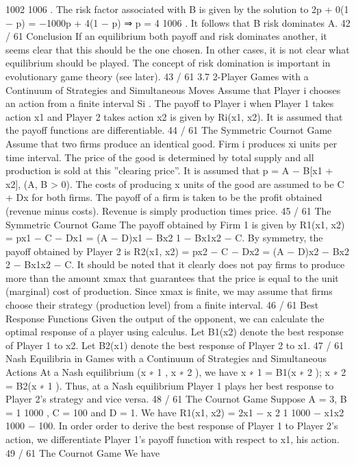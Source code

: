 1002
1006
.
The risk factor associated with B is given by the solution to
2p + 0(1 − p) = −1000p + 4(1 − p) ⇒ p =
4
1006
.
It follows that B risk dominates A.
42 / 61
Conclusion
If an equilibrium both payoff and risk dominates another, it seems
clear that this should be the one chosen.
In other cases, it is not clear what equilibrium should be played.
The concept of risk domination is important in evolutionary game
theory (see later).
43 / 61
3.7 2-Player Games with a Continuum of Strategies and
Simultaneous Moves
Assume that Player i chooses an action from a finite interval Si
.
The payoff to Player i when Player 1 takes action x1 and Player 2
takes action x2 is given by Ri(x1, x2).
It is assumed that the payoff functions are differentiable.
44 / 61
The Symmetric Cournot Game
Assume that two firms produce an identical good. Firm i produces
xi units per time interval.
The price of the good is determined by total supply and all
production is sold at this ”clearing price”. It is assumed that
p = A − B[x1 + x2], (A, B > 0).
The costs of producing x units of the good are assumed to be
C + Dx for both firms.
The payoff of a firm is taken to be the profit obtained (revenue
minus costs). Revenue is simply production times price.
45 / 61
The Symmetric Cournot Game
The payoff obtained by Firm 1 is given by
R1(x1, x2) = px1 − C − Dx1 = (A − D)x1 − Bx2
1 − Bx1x2 − C.
By symmetry, the payoff obtained by Player 2 is
R2(x1, x2) = px2 − C − Dx2 = (A − D)x2 − Bx2
2 − Bx1x2 − C.
It should be noted that it clearly does not pay firms to produce
more than the amount xmax that guarantees that the price is equal
to the unit (marginal) cost of production. Since xmax is finite, we
may assume that firms choose their strategy (production level)
from a finite interval.
46 / 61
Best Response Functions
Given the output of the opponent, we can calculate the optimal
response of a player using calculus.
Let B1(x2) denote the best response of Player 1 to x2.
Let B2(x1) denote the best response of Player 2 to x1.
47 / 61
Nash Equilibria in Games with a Continuum of Strategies
and Simultaneous Actions
At a Nash equilibrium (x
∗
1
, x
∗
2
), we have
x
∗
1 = B1(x
∗
2
); x
∗
2 = B2(x
∗
1
).
Thus, at a Nash equilibrium Player 1 plays her best response to
Player 2’s strategy and vice versa.
48 / 61
The Cournot Game
Suppose A = 3, B =
1
1000 , C = 100 and D = 1.
We have
R1(x1, x2) = 2x1 −
x
2
1
1000
−
x1x2
1000
− 100.
In order order to derive the best response of Player 1 to Player 2’s
action, we differentiate Player 1’s payoff function with respect to
x1, his action.
49 / 61
The Cournot Game
We have
